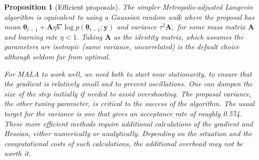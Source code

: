 \documentclass[
  11pt,
  letterpaper,
]{scrbook}
\theoremstyle{definition}
\theoremstyle{plain}
\theoremstyle{plain}
\newtheorem{proposition}{Proposition}[chapter]
\theoremstyle{definition}
\theoremstyle{definition}
\theoremstyle{remark}
\begin{document}
\begin{proposition}[Efficient
proposals]
The simpler Metropolis-adjusted Langevin algorithm is equivalent to
using a Gaussian random walk where the proposal has mean
\(\boldsymbol{\theta}_{t-1} + \mathbf{A}\eta \nabla \log p(\boldsymbol{\theta}_{t-1}; \boldsymbol{y})\)
and variance \(\tau^2\mathbf{A},\) for some mass matrix \(\mathbf{A}\)
and learning rate \(\eta < 1.\) Taking \(\mathbf{A}\) as the identity
matrix, which assumes the parameters are isotropic (same variance,
uncorrelated) is the default choice although seldom far from optimal.

For MALA to work well, we need both to start near stationarity, to
ensure that the gradient is relatively small and to prevent
oscillations. One can dampen the size of the step initially if needed to
avoid overshooting. The proposal variance, the other tuning parameter,
is critical to the success of the algorithm. The usual target for the
variance is one that gives an acceptance rate of roughly 0.574. These
more efficient methods require additional calculations of the gradient
and Hessian, either numerically or analytically. Depending on the
situation and the computational costs of such calculations, the
additional overhead may not be worth it.

\end{proposition}
\end{document}
